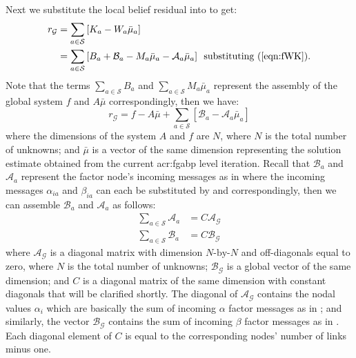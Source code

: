 Next we substitute the local belief residual  into  to get:
\begin{align}
	r_{\mathcal{G}} & = \sum_{a \in \mathcal{S}} \left[ K_a - W_a \bar{\mu}_a \right]\\
	& = \sum_{a \in \mathcal{S}} \left[ B_a +\mathcal{B}_a - M_a \bar{\mu}_a - \mathcal{A}_a \bar{\mu}_a \right]\,\,\, \text{substituting \eqnRef{eqn:fWK}}.
\end{align}
Note that the terms $\sum_{a \in \mathcal{S}} B_a $ and $\sum_{a \in \mathcal{S}} M_a \bar{\mu}_a$ represent the assembly of the global system $f$ and $A\bar{\mu}$ correspondingly, then we have:
\begin{equation}
	r_{\mathcal{G}} = f - A\bar{\mu} + \sum_{a \in \mathcal{S}} \left[ \mathcal{B}_a -  \mathcal{A}_a \bar{\mu}_a \right] \label{eqn:glbResMess}
\end{equation}
where the dimensions of the system $A$ and $f$ are $N$, where $N$ is the total number of unknowns; and $\bar{\mu}$ is a vector of the same dimension representing the solution estimate obtained from the current \gls{acr:fgabp} level iteration.
Recall that $\mathcal{B}_a$ and $\mathcal{A}_a$ represent the factor node's incoming messages as in  where the incoming messages $\alpha_{ia}$ and $\beta_{ia}$ can each be substituted by  and  correspondingly, then we can assemble $\mathcal{B}_a$ and $\mathcal{A}_a$ as follows:
\begin{align}
	\sum_{a \in \mathcal{S}}\mathcal{A}_a & = C \mathcal{A}_{\mathcal{G}} \label{eqn:glbA}\\
	\sum_{a \in \mathcal{S}}\mathcal{B}_a & = C \mathcal{B}_{\mathcal{G}} \label{eqn:glbB}
\end{align}
where $\mathcal{A}_{\mathcal{G}}$ is a diagonal matrix with dimension $N\text{-by-}N$ and off-diagonals equal to zero, where $N$ is the total number of unknowns; $\mathcal{B}_{\mathcal{G}}$ is a global vector of the same dimension; and $C$ is a diagonal matrix of the same dimension with constant diagonals that will be clarified shortly.
The diagonal of $\mathcal{A}_{\mathcal{G}}$ contains the nodal values $\alpha_i$ which are basically the sum of incoming $\alpha$ factor messages as in ; and similarly, the vector $\mathcal{B}_{\mathcal{G}}$ contains the sum of incoming $\beta$ factor messages as in .
Each diagonal element of $C$ is equal to the corresponding nodes' number of links minus one.


